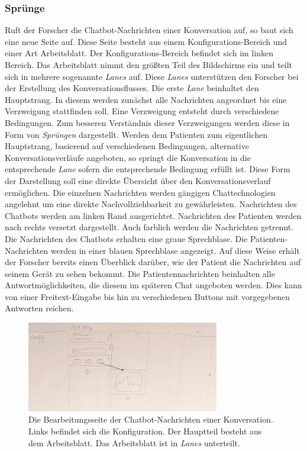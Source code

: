 \subsubsection{Sprünge}
Ruft der Forscher die Chatbot-Nachrichten einer Konversation auf, so baut sich eine neue Seite auf. Diese Seite besteht aus einem Konfigurations-Bereich und einer Art Arbeitsblatt. Der Konfigurations-Bereich befindet sich im linken Bereich. Das Arbeitsblatt nimmt den größten Teil des Bildschirms ein und teilt sich in mehrere sogenannte \emph{Lanes} auf. Diese \emph{Lanes} unterstützen den Forscher bei der Erstellung des Konversationsflusses. Die erste \emph{Lane} beinhaltet den Hauptstrang. In diesem werden zunächst alle Nachrichten angeordnet bis eine Verzweigung stattfinden soll. Eine Verzweigung entsteht durch verschiedene Bedingungen. Zum besseren Verständnis dieser Verzweigungen werden diese in Form von \emph{Sprüngen} dargestellt. Werden dem Patienten zum eigentlichen Hauptstrang, basierend auf verschiedenen Bedingungen, alternative Konversationsverläufe angeboten, so springt die Konversation in die entsprechende \emph{Lane} sofern die entsprechende Bedingung erfüllt ist. Diese Form der Darstellung soll eine direkte Übersicht über den Konversationsverlauf ermöglichen. Die einzelnen Nachrichten werden gängigen Chattechnologien angelehnt um eine direkte Nachvollziehbarkeit zu gewährleisten. Nachrichten des Chatbots werden am linken Rand ausgerichtet. Nachrichten des Patienten werden nach rechts versetzt dargestellt. Auch farblich werden die Nachrichten getrennt. Die Nachrichten des Chatbots erhalten eine graue Sprechblase. Die Patienten-Nachrichten werden in einer blauen Sprechblase angezeigt. Auf diese Weise erhält der Forscher bereits einen Überblick darüber, wie der Patient die Nachrichten auf seinem Gerät zu sehen bekommt. Die Patientennachrichten beinhalten alle Antwortmöglichkeiten, die diesem im späteren Chat angeboten werden. Dies kann von einer Freitext-Eingabe bis hin zu verschiedenen Buttons mit vorgegebenen Antworten reichen.

\begin{figure}[h]
\centering
\includegraphics[width=0.75\textwidth]{pictures/spruengeskz}
\caption{Die Bearbeitungsseite der Chatbot-Nachrichten einer Konversation. Links befindet sich die Konfiguration. Der Hauptteil besteht aus dem Arbeitsblatt. Das Arbeitsblatt ist in \emph{Lanes} unterteilt.}
\label{spruengeskz}
\end{figure}

